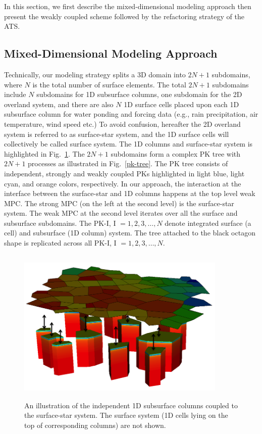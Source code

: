 \documentclass[review]{elsarticle}
\begin{document}
In this section, we first describe the mixed-dimensional modeling approach then present the weakly coupled scheme followed by the refactoring strategy of the ATS.
\subsection{Mixed-Dimensional Modeling Approach}
Technically, our modeling strategy splits a 3D domain into $2N+1$ subdomains, where $N$ is the total number of surface elements. The total $2N+1$ subdomains include $N$ subdomains for 1D subsurface columns, one subdomain for the 2D overland system, and there are also $N$ 1D surface cells placed upon each 1D subsurface column for water ponding and forcing data (e.g., rain precipitation, air temperature, wind speed etc.) To avoid confusion, hereafter the 2D overland system is referred to as surface-star system, and the 1D surface cells will collectively be called surface system. The 1D columns and surface-star system is highlighted in Fig.~\ref{surf-cols}. The $2N+1$ subdomains form a complex PK tree with $2N+1$ processes as illustrated in Fig.~\ref{pk-tree}. The PK tree consists of independent, strongly and weakly coupled PKs highlighted in light blue, light cyan, and orange colors, respectively. In our approach, the interaction at the interface between the surface-star and 1D columns happens at the top level weak MPC. The strong MPC (on the left at the second level) is the surface-star system. The weak MPC at the second level iterates over all the surface and subsurface subdomains. The PK-I, I $=1,2,3, \dots, N$ denote integrated surface (a cell) and subsurface (1D column) system. The tree attached to the black octagon shape is replicated across all PK-I, I $=1,2,3, \dots, N$.

\begin{figure}[!htpb]
\centering
\includegraphics[height = 7.5cm, width=10cm]{figures/mixed-dim-model.png}
\caption{An illustration of the independent 1D subsurface columns coupled to the surface-star system. The surface system (1D cells lying on the top of corresponding columns) are not shown.}
\label{surf-cols}
\end{figure}
\end{document}
